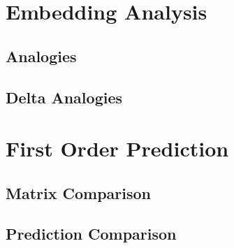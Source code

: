 \section{Embedding Analysis}

\subsection{Analogies}
\subsection{Delta Analogies}

\section{First Order Prediction}

\subsection{Matrix Comparison}
\subsection{Prediction Comparison}
